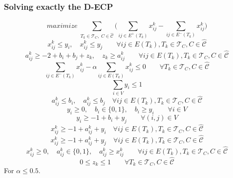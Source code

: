 \documentclass{beamer}
\begin{document}
\begin{frame}[c]
	\frametitle{Solving exactly the D-ECP}

	{\footnotesize
		\begin{equation}
			maximize \; \sum_{ T_{k} \in \mathcal{T}_{C}, \; C \in
				\mathcal{\hat{C}} } \big( \sum^{}_{ij \in E^{+} (T_{k})} x_{ij}
				^{k} - \sum_{ij \in E^{-} (T_{k})} x_{ij} ^{k} \big)
		\end{equation}
		\begin{equation}
			x _{ij}^{k}  \leq y_i, \quad x _{ij} ^{k} \leq y_j \quad\quad \forall ij \in E(T_{k}), T_{k} \in
			\mathcal{T}_{C}, C \in \mathcal{\hat{C}}
		\end{equation}
		\begin{equation}
			a _{ij} ^{k} \geq - 2 + b_i + b_j + z_k , \quad z_k \geq a_{ij}^{k}  \quad\quad \forall ij \in E(T_k), T_k \in \mathcal{T} _{C}, C \in \hat{\mathcal{C} }
		\end{equation}
		\begin{equation}
			\sum^{}_{ij \in E^{-} (T_k)} x_{ij}^{k}  - \alpha \sum^{}_{ij \in E(T_k)}
			x_{ij} ^{k}  \leq 0 \quad\quad \forall T_{k} \in \mathcal{T} _{C}, C \in
			\hat{\mathcal{C}}
		\end{equation}
		\begin{equation}
			\sum^{}_{i \in V} y_i \leq 1
		\end{equation}
		\begin{equation}
			a_{ij}^{k} \leq b_{i}, \quad a_{ij}^{k} \leq b_{j} \quad \forall ij \in E(T_{k}), T_{k} \in
			\mathcal{T}_{C}, C \in \mathcal{\hat{C}}
		\end{equation}
		\begin{equation}
			y _{i} \geq 0, \quad b _{i} \in \{0, 1\},
			\quad b_i \geq y_i\quad\quad \forall i \in V
		\end{equation}
		\begin{equation}
			y_i \geq -1 + b_i + y_j \quad\quad \forall (i, j) \in V
		\end{equation}
		\begin{equation}
			x_{ij}^{k} \geq -1 + a_{ij} ^{k} + y_i \quad \forall ij \in E(T_{k}),
			T_{k} \in \mathcal{T}_{C}, C \in \mathcal{\hat{C}}
		\end{equation}
		\begin{equation}
			x_{ij}^{k} \geq -1 + a_{ij} ^{k} + y_j \quad \forall ij \in E(T_{k}),
			T_{k} \in \mathcal{T}_{C}, C \in \mathcal{\hat{C}}
		\end{equation}
		\begin{equation}
			x _{ij} ^{k}  \geq 0, \quad a _{ij} ^{k}  \in \{0, 1\}, \quad a_{ij}
				^{k} \geq x_{ij} ^{k}  \quad\quad \forall ij \in E(T_{k}), T_{k} \in
			\mathcal{T}_{C}, C \in \mathcal{\hat{C}}
		\end{equation}
		\begin{equation}
			0 \leq z _{k} \leq 1 \quad\quad \forall T_{k} \in \mathcal{T} _{C}, C \in
			\hat{\mathcal{C}}
		\end{equation}
		For $\alpha \leq 0.5$.
	}
\end{frame}
\end{document}
